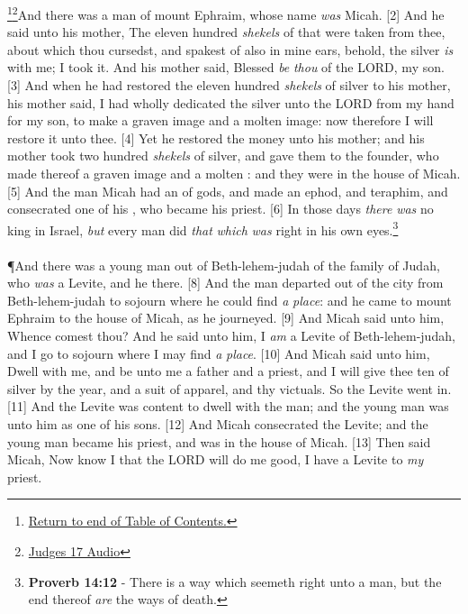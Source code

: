 \footnote{\textcolor[rgb]{0.00,0.25,0.00}{\hyperlink{TOC}{Return to end of Table of Contents.}}}\footnote{\href{https://audiobible.com/bible/judges_17.html}{\textcolor[cmyk]{0.99998,1,0,0}{Judges 17 Audio}}}\textcolor[cmyk]{0.99998,1,0,0}{And there was a man of mount Ephraim, whose name \emph{was} Micah.}
[2] \textcolor[cmyk]{0.99998,1,0,0}{And he said unto his mother, The eleven hundred \emph{shekels} of  that were taken from thee, about which thou cursedst, and spakest of also in mine ears, behold, the silver \emph{is} with me; I took it. And his mother said, Blessed \emph{be} \emph{thou} of the LORD, my son.}
[3] \textcolor[cmyk]{0.99998,1,0,0}{And when he had restored the eleven hundred \emph{shekels} of silver to his mother, his mother said, I had wholly dedicated the silver unto the LORD from my hand for my son, to make a graven image and a molten image: now therefore I will restore it unto thee.}
[4] \textcolor[cmyk]{0.99998,1,0,0}{Yet he restored the money unto his mother; and his mother took two hundred \emph{shekels} of silver, and gave them to the founder, who made thereof a graven image and a molten : and they were in the house of Micah.}
[5] \textcolor[cmyk]{0.99998,1,0,0}{And the man Micah had an  of gods, and made an ephod, and teraphim, and consecrated one of his , who became his priest.}
[6] \textcolor[cmyk]{0.99998,1,0,0}{In those days \emph{there} \emph{was} no king in Israel, \emph{but} every man did \emph{that} \emph{which} \emph{was} right in his own eyes.}\footnote{\textbf{Proverb 14:12} - There is a way which seemeth right unto a man, but the end thereof \emph{are} the ways of death.}\\
\\
\P\textcolor[cmyk]{0.99998,1,0,0}{And there was a young man out of Beth-lehem-judah of the family of Judah, who \emph{was} a Levite, and he  there.}
[8] \textcolor[cmyk]{0.99998,1,0,0}{And the man departed out of the city from Beth-lehem-judah to sojourn where he could find \emph{a} \emph{place}: and he came to mount Ephraim to the house of Micah, as he journeyed.}
[9] \textcolor[cmyk]{0.99998,1,0,0}{And Micah said unto him, Whence comest thou? And he said unto him, I \emph{am} a Levite of Beth-lehem-judah, and I go to sojourn where I may find \emph{a} \emph{place}.}
[10] \textcolor[cmyk]{0.99998,1,0,0}{And Micah said unto him, Dwell with me, and be unto me a father and a priest, and I will give thee ten  of silver by the year, and a suit of apparel, and thy victuals. So the Levite went in.}
[11] \textcolor[cmyk]{0.99998,1,0,0}{And the Levite was content to dwell with the man; and the young man was unto him as one of his sons.}
[12] \textcolor[cmyk]{0.99998,1,0,0}{And Micah consecrated the Levite; and the young man became his priest, and was in the house of Micah.}
[13] \textcolor[cmyk]{0.99998,1,0,0}{Then said Micah, Now know I that the LORD will do me good,  I have a Levite to \emph{my} priest.}